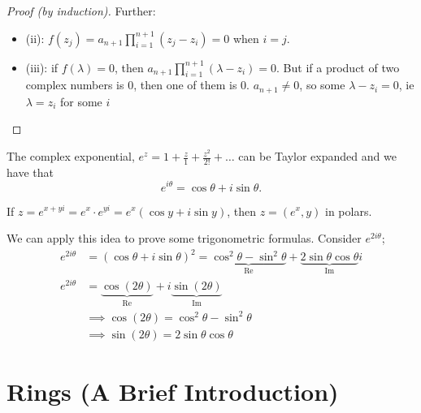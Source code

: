 \documentclass[12pt,oneside]{article}
\begin{document}
\begin{proof}[Proof (by induction)]
  Further:

  \begin{itemize}
    \item (ii): $f(z_j) = a_{n+1} \prod_{i=1}^{n+1} (z_j - z_i) = 0$ when $i =j$.

    \item (iii): if $f(\lambda) = 0$, then $a_{n+1} \prod_{i=1}^{n+1}(\lambda - z_i) = 0$. But if a product of two complex numbers is 0, then one of them is 0. $a_{n+1} \neq 0$, so some $\lambda - z_i = 0$, ie $\lambda = z_i$ for some $i$\footnotemark
  \end{itemize}
\end{proof}

\begin{definition}
  The complex exponential, $e^z = 1 + \frac{z}{1} + \frac{z^2}{2!} + \dots$ can be Taylor expanded and we have that \[e^{i \theta} = \cos \theta + i \sin \theta.\]
\end{definition}

\begin{example}
  If $z = e^{x+yi} = e^x \cdot e^{yi} = e^x (\cos y + i \sin y)$, then $z = (e^x, y)$ in polars.

  We can apply this idea to prove some trigonometric formulas. Consider $e^{2i \theta}$; \begin{align*}
      e^{2i \theta} &= (\cos \theta + i \sin \theta)^2 = \underbrace{\cos^2 \theta - \sin^2 \theta}_{\text{Re}} + \underbrace{2 \sin \theta \cos \theta }_{\text{Im}}i\\
      e^{2i \theta} &= \underbrace{\cos(2 \theta)}_{\text{Re}} + i \underbrace{\sin (2 \theta)}_{\text{Im}}\\
      &\implies \cos(2 \theta) = \cos^2 \theta - \sin^2 \theta\\
      &\implies \sin(2 \theta) = 2 \sin \theta \cos \theta
    \end{align*}
\end{example}



\section{Rings (A Brief Introduction)}
\end{document}
